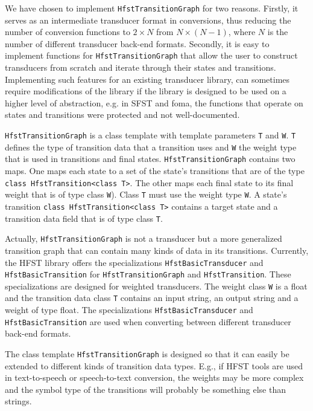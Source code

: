 \documentclass{llncs}
\begin{document}
We have chosen to implement \texttt{HfstTransitionGraph} for two
reasons. Firstly, it serves as an intermediate transducer format in
conversions, thus reducing the number of conversion functions to
$2 \times N$ from $N \times (N - 1)$, where $N$ is the number of different
transducer back-end formats. Secondly, it is easy to implement functions for 
\texttt{HfstTransitionGraph} that allow the user to construct transducers from 
scratch and iterate through their states and transitions. Implementing
such features for an existing transducer library, can sometimes require modifications
of the library if the library is designed to be used on a higher level of abstraction, 
e.g. in SFST and foma, the functions that operate on states and 
transitions were protected and not well-documented.

\texttt{HfstTransitionGraph} is a class template with template parameters 
\texttt{T} and \texttt{W}. \texttt{T} defines the type of transition data
that a transition uses and \texttt{W} the weight type that is used 
in transitions and final states. 
\texttt{HfstTransitionGraph} contains two maps. One maps each state to a set of
the state's transitions that are of the type \texttt{class HfstTransition\textless class T\textgreater}. 
The other maps each final state to its final weight that is of type class \texttt{W}). 
Class \texttt{T} must use the weight type \texttt{W}. 
A state's transition \texttt{class HfstTransition\textless class T\textgreater} 
contains a target state and a transition data field that is of type class 
\texttt{T}.

Actually, \texttt{HfstTransitionGraph} is not a transducer but a more
generalized transition graph that can contain many kinds of data in
its transitions. Currently, the HFST library offers the specializations 
\texttt{HfstBasicTransducer} and \texttt{HfstBasicTransition} 
for \texttt{HfstTransitionGraph} and \texttt{HfstTransition}.
These specializations are designed for weighted 
transducers. The weight class \texttt{W} is a float and the transition data
class \texttt{T} contains an input string, an output string and a weight of
type float. The specializations \texttt{HfstBasicTransducer} and
\texttt{HfstBasicTransition} are used when converting between different
transducer back-end formats.

The class template \texttt{HfstTransitionGraph} is designed so that it can
easily be extended to different kinds of transition data types. E.g., 
if HFST tools are used in text-to-speech or speech-to-text
conversion, the weights may be more complex and the symbol type of the transitions 
will probably be something else than strings.
\end{document}
